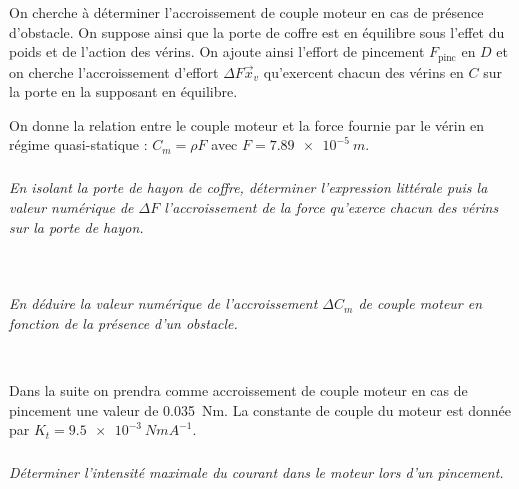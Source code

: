 \documentclass[10pt,fleqn]{article} %
\begin{document}
\begin{multicols}{2}
%

On cherche à déterminer l’accroissement de couple moteur en cas de présence d’obstacle. On suppose ainsi que la
porte de coffre est en équilibre sous l’effet du poids et de l’action des vérins. On ajoute ainsi l’effort de pincement
$ F_{\text{pinc}}$ en $D$ et on cherche l’accroissement d’effort $\Delta F\vec{x}_v$ qu’exercent chacun des vérins en $C$ sur la porte en la supposant en équilibre.

On donne la relation entre le couple moteur et la force fournie par le vérin en régime quasi-statique : $C_m=\rho F$ avec $F=\SI{7,89e-5}{m}$.
\subparagraph{}
\textit{En isolant la porte de hayon de coffre, déterminer l’expression littérale puis la valeur
numérique de $\Delta F$ l’accroissement de la force qu’exerce chacun des vérins sur la porte de hayon.}
\ifprof
\begin{corrige}~\\

\end{corrige}
\else

\fi

\subparagraph{}
\textit{En déduire la valeur numérique de l’accroissement $\Delta C_m$  de couple moteur en fonction de la présence d’un obstacle.}%
\ifprof
\begin{corrige}~\\

\end{corrige}
\else
\fi

Dans la suite on prendra comme accroissement de couple moteur en cas de pincement une valeur de \SI{0,035}{Nm}. La constante de couple du moteur est donnée par $K_t = \SI{9,5e-3}{NmA^{-1}}$.
\subparagraph{}
\textit{Déterminer l’intensité maximale du courant dans le moteur lors d’un pincement.}
\ifprof
\begin{corrige}~\\

\end{corrige}
\else
\fi


\ifprof
\else
\end{multicols}
\fi
\end{document}
